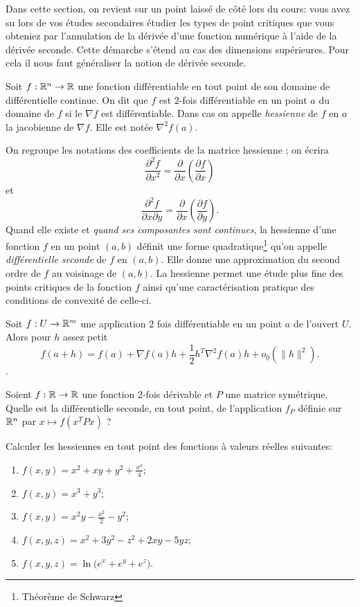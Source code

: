 \documentclass[11pt, a4paper]{article}
\begin{document}
Dans cette section, on revient sur un point laissé de côté lors du
cours: vous avez su lors de vos études secondaires étudier les types
de point critiques que vous obteniez par l'annulation de la dérivée
d'une fonction numérique à l'aide de la dérivée seconde. Cette
démarche s'étend au cas des dimensions supérieures. Pour cela il nous
faut généraliser la notion de dérivée seconde.
\begin{defn}
  Soit $f : \mathbb{R}^n \to \mathbb{R}$ une fonction différentiable en tout point de
  son domaine de différentielle continue. On dit que $f$ est $2$-fois
  différentiable en un point $a$ du domaine de $f$ si le $\nabla f$
  est différentiable. Dans cas on appelle \emph{hessienne} de $f$ en
  $a$ la jacobienne de $\nabla f$. Elle est notée $\nabla^2 f(a)$.
\end{defn}
On regroupe les notations des coefficients de la matrice hessienne ;
on écrira
\[
  \frac{\partial^2 f}{\partial x^2} = \frac{\partial}{\partial
    x}\left(\frac{\partial f}{\partial x}\right)
\]
et
\[
  \frac{\partial^2 f}{\partial x\partial y} = \frac{\partial}{\partial
    x}\left(\frac{\partial f}{\partial y}\right).
\]
Quand elle existe et \textit{quand ses composantes sont continues}, la
hessienne d'une fonction $f$ en un point $(a, b)$ définit une forme
quadratique\footnote{Théorème de Schwarz} qu'on appelle
\emph{différentielle seconde} de $f$ en $(a, b)$. Elle donne une
approximation du second ordre de $f$ au voisinage de $(a, b)$.  La
hessienne permet une étude plus fine des points critiques de la
fonction $f$ ainsi qu'une caractérisation pratique des conditions de
convexité de celle-ci.
\begin{prop}
  Soit $f : U \to \mathbb{R}^m$ une application $2$ fois différentiable en un
  point $a$ de l'ouvert $U$. Alors pour $h$ assez petit
  \begin{equation}
    \label{eq:DL2}
    f(a+h) = f(a) + \nabla f(a) h + \dfrac{1}{2} h^T\nabla^2f(a)h  + o_{\underline{0}}(\|h\|^2).
  \end{equation}.
\end{prop}
\begin{question}
  Soient $f : \mathbb{R} \to \mathbb{R}$ une fonction $2$-fois dérivable et $P$ une
  matrice symétrique.  Quelle est la différentielle seconde, en tout
  point, de l'application $f_P$ définie sur $\mathbb{R}^n$ par
  $x \mapsto f(x^TPx)$ ?
\end{question}
\begin{question}
  \label{eq:hessienne}
  Calculer les hessiennes en tout point des fonctions à valeurs
  réelles suivantes:
  \begin{enumerate}
  \item $f(x, y) = x^2 + xy + y^2 + \displaystyle{\frac{x^3}{4}}$;
  \item $f(x, y) = x^3 + y^3$;
  \item $f(x, y) = x^2y - \displaystyle{\frac{x^2}{2}} - y^2$;
  \item $f(x, y, z) = x^2 + 3y^2 - z^2 + 2xy - 5yz$;
  \item $f(x, y, z) = \ln\big(e^x + e^y +e^z\big)$.
  \end{enumerate}
\end{question}
\end{document}

